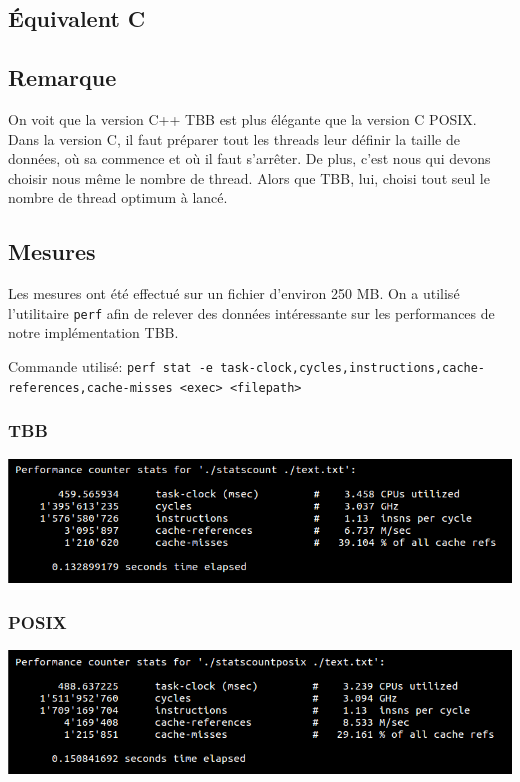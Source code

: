 \documentclass[10pt,a4paper]{article}
\begin{document}
\subsection{Équivalent C}



\subsection{Remarque}
On voit que la version C++ TBB est plus élégante que la version C POSIX. Dans la version C, il faut préparer tout les threads leur définir la taille de données, où sa commence et où il faut s'arrêter. De plus, c'est nous qui devons choisir nous même le nombre de thread. Alors que TBB, lui, choisi tout seul le nombre de thread optimum à lancé.

\subsection{Mesures}
Les mesures ont été effectué sur un fichier d'environ 250 MB. On a utilisé l'utilitaire \texttt{perf} afin de relever des données intéressante sur les performances de notre implémentation TBB.

Commande utilisé: \texttt{perf stat -e task-clock,cycles,instructions,cache-references,cache-misses <exec> <filepath> }

\subsubsection{TBB}
\includegraphics[scale=0.5]{images/perf_tbb}


\subsubsection{POSIX}
\includegraphics[scale=0.5]{images/perf_posix}
\newpage
\end{document}
